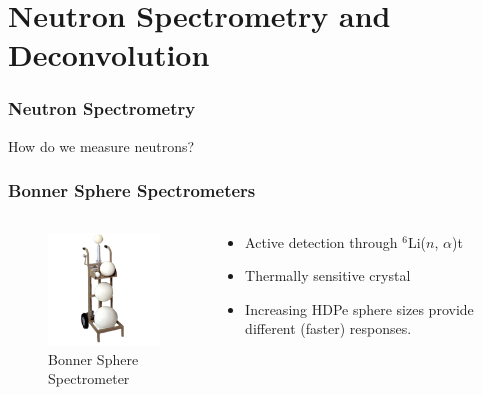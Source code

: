 \documentclass[fleqn]{beamer}
\begin{document}
\section{Neutron Spectrometry and Deconvolution}
\begin{frame}
\frametitle{Neutron Spectrometry}

How do we measure neutrons?

\end{frame}

\begin{frame}
\frametitle{Bonner Sphere Spectrometers}
\begin{columns}[c]
\begin{column}{.5\textwidth}
\begin{figure}
\includegraphics[width=\textwidth]{bss}
\caption{Bonner Sphere Spectrometer}
\end{figure}
\end{column}
\begin{column}{.5\textwidth}
\begin{itemize}
\item Active detection through $^6$Li($n$, $\alpha$)t \cite{bramblett1960new}
\item Thermally sensitive crystal
\item Increasing HDPe sphere sizes provide different (faster) responses.
\end{itemize}
\end{column}
\end{columns}
\end{frame}
\end{document}
